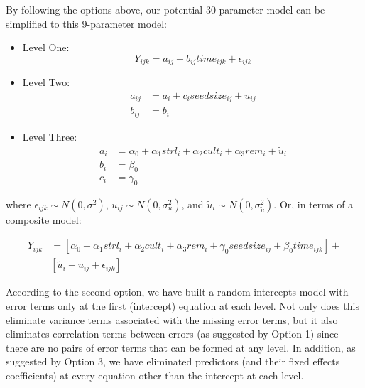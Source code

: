 \documentclass[
]{krantz}
\providecommand{\tightlist}{%
  \setlength{\itemsep}{0pt}\setlength{\parskip}{0pt}}
\begin{document}
By following the options above, our potential 30-parameter model can be simplified to this 9-parameter model:

\begin{itemize}
\tightlist
\item
  Level One:
  \begin{equation}
  Y_{ijk} = a_{ij}+b_{ij}\textstyle{time}_{ijk}+\epsilon_{ijk}
  \end{equation}
\item
  Level Two:
  \begin{align*}
  a_{ij} & = a_{i}+c_{i}\textstyle{seedsize}_{ij}+u_{ij} \\
  b_{ij} & = b_{i}
  \end{align*}
\item
  Level Three:
  \begin{align*}
  a_{i} & = \alpha_{0} + \alpha_{1}\textstyle{strl}_{i} + \alpha_{2}\textstyle{cult}_{i} + \alpha_{3}\textstyle{rem}_{i} + \tilde{u}_{i} \\
  b_{i} & = \beta_{0} \\
  c_{i} & = \gamma_{0}
  \end{align*}
\end{itemize}

where \(\epsilon_{ijk}\sim N(0,\sigma^2)\), \(u_{ij}\sim N(0,\sigma_{u}^{2})\), and \(\tilde{u}_{i}\sim N(0,\sigma_{\tilde{u}}^{2})\). Or, in terms of a composite model:

\begin{align*}
Y_{ijk} & = [\alpha_{0}+\alpha_{1}\textstyle{strl}_{i}+\alpha_{2}\textstyle{cult}_{i}+\alpha_{3}\textstyle{rem}_{i} +
 \gamma_{0}\textstyle{seedsize}_{ij} + \beta_{0}\textstyle{time}_{ijk}] + \\
 &  [\tilde{u}_{i}+u_{ij}+\epsilon_{ijk}]
\end{align*}

According to the second option, we have built a random intercepts model with error terms only at the first (intercept) equation at each level. Not only does this eliminate variance terms associated with the missing error terms, but it also eliminates correlation terms between errors (as suggested by Option 1) since there are no pairs of error terms that can be formed at any level. In addition, as suggested by Option 3, we have eliminated predictors (and their fixed effects coefficients) at every equation other than the intercept at each level.
\end{document}
